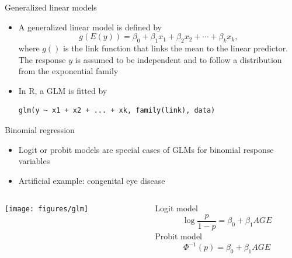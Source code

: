 \documentclass[aspectratio=169]{beamer}
\begin{document}
% 
% 
% 
% 


\begin{frame}[fragile]{Generalized linear models}
  \begin{itemize}
    \item A generalized linear model is defined by
\[
  g(E(y)) = \beta_0 + \beta_1 x_1 + \beta_2 x_2 + \cdots + \beta_k x_k,
\]
where $g()$ is the link function that links the mean to the linear predictor.
The response $y$ is assumed to be independent and to follow a distribution
from the exponential family

\item In R, a GLM is fitted by

  \begin{lstlisting}[style=plain]
  glm(y ~ x1 + x2 + ... + xk, family(link), data)
\end{lstlisting}
  \end{itemize}
\end{frame}


\begin{frame}{Binomial regression}
  \begin{itemize}
    \item Logit or probit models are special cases of GLMs for binomial
      response variables
    \item Artificial example: congenital eye disease
  \end{itemize}
\begin{columns}[c]
\begin{column}{6cm}
  \texttt{[image: figures/glm]}
\end{column}
\begin{column}{5cm}
Logit model
\[
  \log\frac{p}{1 - p} = \beta_0 + \beta_1 AGE
\]
Probit model
\[
  \Phi^{-1}(p) = \beta_0 + \beta_1 AGE
\]
\end{column}
\end{columns}
\end{frame}
\end{document}
